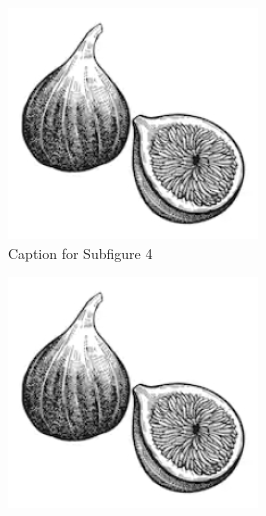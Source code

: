 \documentclass[lettersize,journal]{IEEEtran} %
\begin{document}
\begin{figure}[!t]
    \begin{subfigure}{0.3\columnwidth}
      \includegraphics[width=\linewidth]{fig1.png}
      \caption{Caption for Subfigure 4}
      \label{fig:subfig4}
    \end{subfigure}
    \hfill
    \begin{subfigure}{0.3\columnwidth}
      \includegraphics[width=\linewidth]{fig1.png}

\end{subfigure}
\end{figure}
\end{document}
